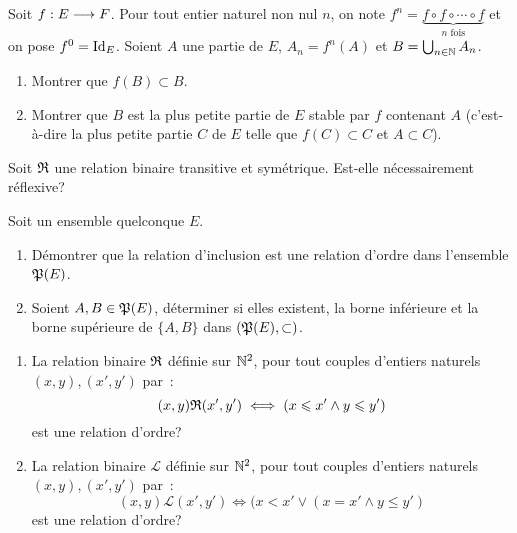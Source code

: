 \begin{exercice}
    Soit \(f:E \longrightarrow F\). Pour tout entier naturel non nul \(n\), on 
    note \(f^n = \underbrace{f \circ f \circ \cdots \circ f}_{n \textrm{ 
    fois}}\) et on pose \(f^0 = \operatorname{Id}_E\). Soient \(A\) une partie de \(E\), \(A_n 
    = f^{n}(A)\) et \(B = \bigcup_{n\in \mathbb{N}} A_n\).
    \begin{enumerate}
        \item Montrer que \(f(B) \subset B\).
        \item Montrer que \(B\) est la plus petite partie de \(E\) stable par 
            \(f\) contenant \(A\) (c'est-à-dire la plus petite partie \(C\) de 
            \(E\) telle que \(f(C) \subset C\) et \(A \subset C\)).
    \end{enumerate}
\end{exercice}

\begin{exercice}
    Soit \(\mathfrak{R}\) une relation binaire transitive et symétrique. Est-elle 
    nécessairement réflexive?
\end{exercice}

\begin{exercice}
    Soit un ensemble quelconque \(E\).
    \begin{enumerate}
        \item Démontrer que la relation d'inclusion est une relation d'ordre 
            dans l'ensemble \(\mathfrak{P}(E)\).
        \item Soient \(A, B \in \mathfrak{P}(E)\), déterminer si elles existent, la 
            borne inférieure et la borne supérieure de \(\{A, B\}\) dans 
            \((\mathfrak{P}(E), \subset)\).
    \end{enumerate}
\end{exercice}

\begin{exercice}
    \begin{enumerate}
        \item La relation binaire \(\mathfrak{R}\) définie sur \(\mathbb{N}^2\), pour tout 
            couples d'entiers naturels \((x, y), (x', y')\) par~: 
            \[(x, y)\mathfrak{R}{}(x', y') \iff (x \leqslant x' \land y \leqslant y')\] 
            est une relation d'ordre?
        \item La relation binaire \(\mathcal{L}\) définie sur \(\mathbb{N}^2\), pour 
            tout couples d'entiers naturels \((x, y), (x', y')\) par~: 
            \[(x, y)\mathcal{L}(x', y') \iff (x < x' \lor (x = x' \land y 
            \leqslant y')\] est une relation d'ordre?
    \end{enumerate}
\end{exercice}
